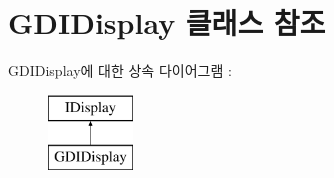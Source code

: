 \hypertarget{class_g_d_i_display}{}\section{G\+D\+I\+Display 클래스 참조}
\label{class_g_d_i_display}
G\+D\+I\+Display에 대한 상속 다이어그램 \+: \begin{figure}[H]
\begin{center}
\leavevmode
\includegraphics[height=2.000000cm]{class_g_d_i_display}
\end{center}
\end{figure}

